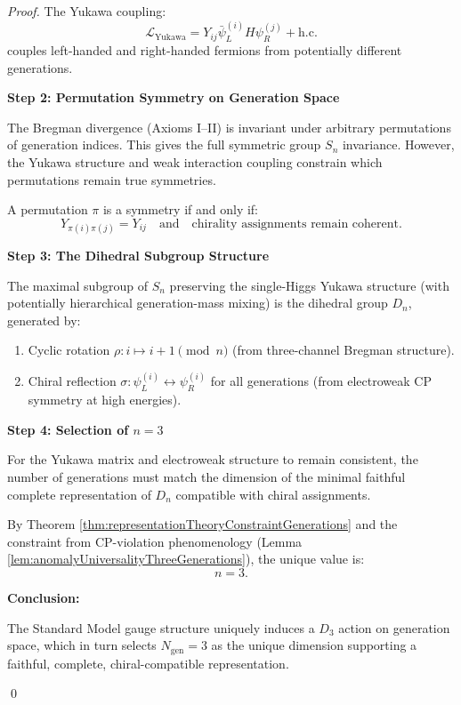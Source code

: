 \begin{theorem}
\begin{proof}
The Yukawa coupling:
\begin{equation}
\mathcal{L}_{\mathrm{Yukawa}} = Y_{ij} \bar{\psi}^{(i)}_L H \psi^{(j)}_R + \mathrm{h.c.}
\end{equation}
couples left-handed and right-handed fermions from potentially different generations.

\textbf{Step 2: Permutation Symmetry on Generation Space}

The Bregman divergence (Axioms I--II) is invariant under arbitrary permutations of generation indices. This gives the full symmetric group $S_n$ invariance. However, the Yukawa structure and weak interaction coupling constrain which permutations remain true symmetries.

A permutation $\pi$ is a symmetry if and only if:
\begin{equation}
Y_{\pi(i)\pi(j)} = Y_{ij} \quad \text{and} \quad \text{chirality assignments remain coherent}.
\end{equation}

\textbf{Step 3: The Dihedral Subgroup Structure}

The maximal subgroup of $S_n$ preserving the single-Higgs Yukawa structure (with potentially hierarchical generation-mass mixing) is the dihedral group $D_n$, generated by:
\begin{enumerate}
\item Cyclic rotation $\rho: i \mapsto i+1 \pmod{n}$ (from three-channel Bregman structure).
\item Chiral reflection $\sigma: \psi_L^{(i)} \leftrightarrow \psi_R^{(i)}$ for all generations (from electroweak CP symmetry at high energies).
\end{enumerate}

\textbf{Step 4: Selection of $n = 3$}

For the Yukawa matrix and electroweak structure to remain consistent, the number of generations must match the dimension of the minimal faithful complete representation of $D_n$ compatible with chiral assignments.

By Theorem \ref{thm:representationTheoryConstraintGenerations} and the constraint from CP-violation phenomenology (Lemma \ref{lem:anomalyUniversalityThreeGenerations}), the unique value is:
\begin{equation}
n = 3.
\end{equation}

\textbf{Conclusion:}

The Standard Model gauge structure uniquely induces a $D_3$ action on generation space, which in turn selects $N_{\mathrm{gen}} = 3$ as the unique dimension supporting a faithful, complete, chiral-compatible representation.

\qed

\end{proof}

\end{theorem}
